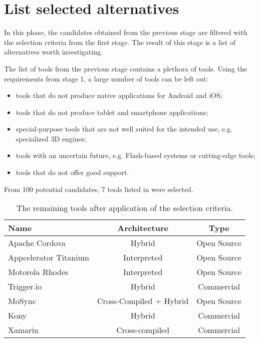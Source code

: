 \section{List selected alternatives}

In this phase, the candidates obtained from the previous stage are filtered with the selection criteria from the first stage. The result of this stage is a list of alternatives worth investigating.

The list of tools from the previous stage contains a plethora of tools. Using the requirements from stage 1, a large number of tools can be left out:

\begin{itemize}
    \item tools that do not produce native applications for Android and iOS;
    \item tools that do not produce tablet and smartphone applications;
    \item special-purpose tools that are not well suited for the intended use, e.g. specialized 3D engines;
    \item tools with an uncertain future, e.g. Flash-based systems or cutting-edge tools;
    \item tools that do not offer good support. 
\end{itemize}

From 100 potential candidates, 7 tools listed in  were selected.

\begin{table}[h!]
    \begin{center}
        \begin{tabular}{lcc}
            \hline
            Name & Architecture & Type \\
            \hline 
            Apache Cordova & Hybrid & Open Source \\
            Appcelerator Titanium & Interpreted & Open Source \\
            Motorola Rhodes & Interpreted & Open Source \\
            Trigger.io & Hybrid & Commercial \\
            MoSync & Cross-Compiled + Hybrid & Open Source \\
            Kony & Hybrid & Commercial \\
            Xamarin & Cross-compiled & Commercial \\
            \hline
        \end{tabular}
        \caption{The remaining tools after application of the selection criteria.}
        \label{table:tools}
    \end{center}
\end{table}

